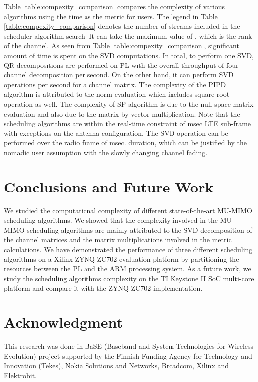 \documentclass[conference,letterpaper,10pt]{./../../IEEE/IEEEtran}
\begin{document}
Table \ref{table:compexity_comparison} compares the complexity of various algorithms using the time as the metric for  users. The legend \me{\lambda} in Table \ref{table:compexity_comparison} denotes the number of streams included in the scheduler algorithm search. It can take the maximum value of \me{\kappa}, which is the rank of the channel. As seen from Table \ref{table:compexity_comparison}, significant amount of time is spent on the SVD computations. In total, to perform one SVD,  QR decompositions are performed on PL with the overall throughput of four  channel decomposition per second. On the other hand, it can perform  SVD operations per second for a  channel matrix. The complexity of the PIPD algorithm is attributed to the norm evaluation which includes square root operation as well. The complexity of SP algorithm is due to the null space matrix evaluation and also due to the matrix-by-vector multiplication. Note that the scheduling algorithms are within the real-time constraint of  msec LTE sub-frame with exceptions on the  antenna configuration. The SVD operation can be performed over the radio frame of  msec. duration, which can be justified by the nomadic user assumption with the slowly changing channel fading.

\acresetall {}
\section{Conclusions and Future Work}
\label{sec:conclusion}
We studied the computational complexity of different state-of-the-art MU-MIMO scheduling algorithms. We showed that the complexity involved in the \ac{MU-MIMO} scheduling algorithms are mainly attributed to the SVD decomposition of the channel matrices and the matrix multiplications involved in the metric calculations. We have demonstrated the performance of three different scheduling algorithms on a Xilinx ZYNQ ZC702 evaluation platform by partitioning the resources between the PL and the ARM processing system. As a future work, we study the scheduling algorithms complexity on the TI Keystone II \ac{SoC} multi-core platform and compare it with the ZYNQ ZC702 implementation.

\section*{Acknowledgment}
This research was done in BaSE (Baseband and System Technologies for Wireless Evolution) project supported by the Finnish Funding Agency for Technology and Innovation (Tekes), Nokia Solutions and Networks, Broadcom, Xilinx and Elektrobit.



%
\end{document}
